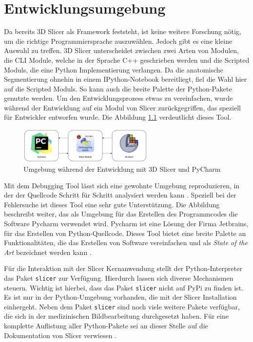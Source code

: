 \chapter{Entwicklungsumgebung}
\label{chap:entwicklungsumgebung} Da bereits 3D Slicer als Framework feststeht,
ist keine weitere Forschung nötig, um die richtige Programmiersprache auszuwählen.
Jedoch gibt es eine kleine Auswahl zu treffen. 3D Slicer unterscheidet zwischen zwei
Arten von Modulen, die \ac{CLI} Module, welche in der Sprache C++ geschrieben
werden und die Scripted Moduls, die eine Python Implementierung verlangen. Da
die anatomische Segmentierung ohnehin in einem IPython-Notebook bereitliegt, fiel
die Wahl hier auf die Scripted Moduls. So kann auch die breite Palette der
Python-Pakete genutzte werden. Um den Entwicklungsprozess etwas zu vereinfachen,
wurde während der Entwicklung auf ein Modul von Slicer zurückgegriffen, das speziell
für Entwickler entworfen wurde. Die Abbildung \ref{fig:entwicklungsumgebung}
verdeutlicht dieses Tool.

\begin{figure}[h]
	\centering
	\includegraphics[width=0.6\textwidth]{img/Entwicklungsumgebung.png}
	\caption{Umgebung während der Entwicklung mit 3D Slicer und PyCharm}
	\label{fig:entwicklungsumgebung}
\end{figure}

Mit dem Debugging Tool lässt sich eine gewohnte Umgebung reproduzieren, in der
der Quellcode Schritt für Schritt analysiert werden kann \citep[vgl.][]{slicerdebuggingtools}.
Speziell bei der Fehlersuche ist dieses Tool eine sehr gute Unterstützung. Die Abbildung
beschreibt weiter, das als Umgebung für das Erstellen des Programmcodes die
Software Pycharm verwendet wird. Pycharm ist eine Lösung der Firma Jetbrains,
für das Erstellen von Python-Quellcode. Dieses Tool bietet eine breite Palette an
Funktionalitäten, die das Erstellen von Software vereinfachen und als \textit{State
of the Art} bezeichnet werden kann \citep[vgl.][]{jetbrains2024}.

Für die Interaktion mit der Slicer Kernanwendung stellt der Python-Interpreter
das Paket \texttt{slicer} zur Verfügung. Hierdurch lassen sich diverse
Mechanismen steuern. Wichtig ist hierbei, dass das Paket \texttt{slicer} nicht auf
\ac{PyPi} zu finden ist. Es ist nur in der Python-Umgebung vorhanden, die mit
der Slicer Installation einhergeht. Neben dem Paket \texttt{slicer} sind noch
viele weitere Pakete verfügbar, die sich in der medizinischen Bildbearbeitung durchgesetzt
haben. Für eine komplette Auflistung aller Python-Pakete sei an dieser Stelle
auf die Dokumentation von Slicer verwiesen \citep[vgl.][]{slicer2024}.

